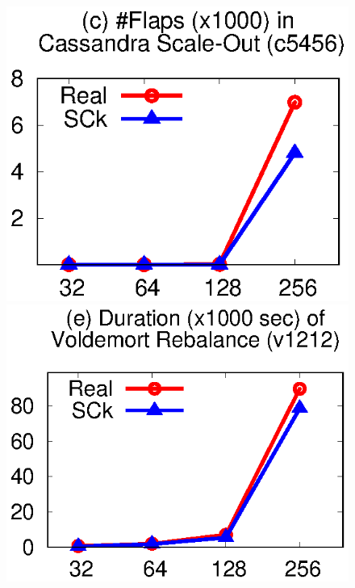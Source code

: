 \begin{figure}
\centerline{
\includegraphics[width=\fgw]{F/old-bugs/eps/cass4.eps}
\includegraphics[width=\fgw]{F/old-bugs/eps/vold1.eps}
}


\end{figure}
